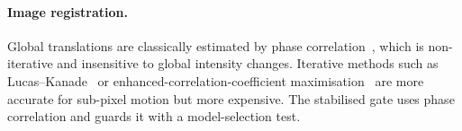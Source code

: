 \paragraph{Image registration.} Global translations are classically estimated by phase correlation~\cite{kuglin1975phase}, which is non-iterative and insensitive to global intensity changes. Iterative methods such as Lucas--Kanade~\cite{lucas1981iterative} or enhanced-correlation-coefficient maximisation~\cite{evangelidis2008ecc} are more accurate for sub-pixel motion but more expensive. The stabilised gate uses phase correlation and guards it with a model-selection test.
